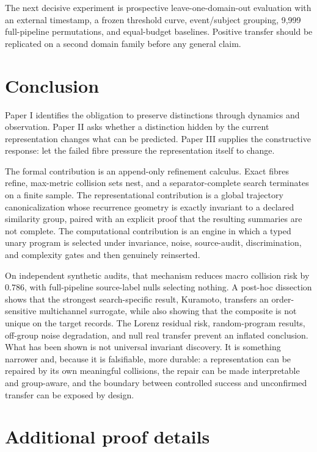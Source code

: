\documentclass[10pt]{article}
\theoremstyle{definition}
\theoremstyle{remark}
\begin{document}
The next decisive experiment is prospective leave-one-domain-out evaluation with an external timestamp, a frozen threshold curve, event/subject grouping, 9,999 full-pipeline permutations, and equal-budget baselines. Positive transfer should be replicated on a second domain family before any general claim.

\section{Conclusion}

Paper I identifies the obligation to preserve distinctions through dynamics and observation. Paper II asks whether a distinction hidden by the current representation changes what can be predicted. Paper III supplies the constructive response: let the failed fibre pressure the representation itself to change.

The formal contribution is an append-only refinement calculus. Exact fibres refine, max-metric collision sets nest, and a separator-complete search terminates on a finite sample. The representational contribution is a global trajectory canonicalization whose recurrence geometry is exactly invariant to a declared similarity group, paired with an explicit proof that the resulting summaries are not complete. The computational contribution is an engine in which a typed unary program is selected under invariance, noise, source-audit, discrimination, and complexity gates and then genuinely reinserted.

On independent synthetic audits, that mechanism reduces macro collision risk by $0.786$, with full-pipeline source-label nulls selecting nothing. A post-hoc dissection shows that the strongest search-specific result, Kuramoto, transfers an order-sensitive multichannel surrogate, while also showing that the composite is not unique on the target records. The Lorenz residual risk, random-program results, off-group noise degradation, and null real transfer prevent an inflated conclusion. What has been shown is not universal invariant discovery. It is something narrower and, because it is falsifiable, more durable: a representation can be repaired by its own meaningful collisions, the repair can be made interpretable and group-aware, and the boundary between controlled success and unconfirmed transfer can be exposed by design.

\appendix

\section{Additional proof details}
\end{document}

